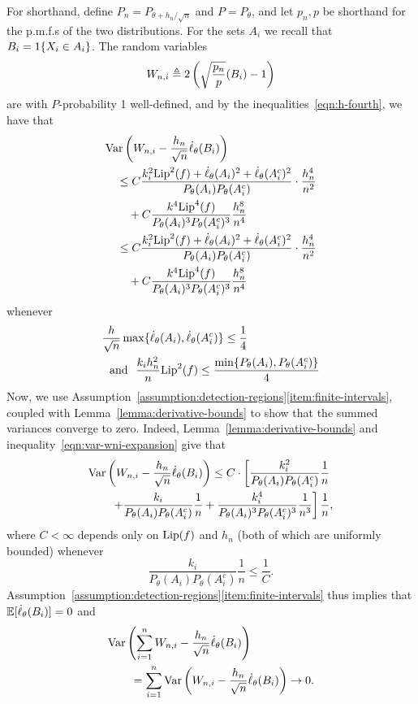 For shorthand, define $P_n = P_{\theta + h_n / \sqrt{n}}$ and $P =
P_\theta$, and let $p_n, p$ be shorthand for the p.m.f.s of the two
distributions.  For the sets $A_i$ we recall that $B_i = 1\!\left\{X_i \in
  A_i\right\}$.  The random variables
\begin{equation*}
  W_{n,i} \triangleq 2 \left(\sqrt{\frac{p_n}{p}}(B_i) - 1\right)
\end{equation*}
are with $P$-probability 1 well-defined, and by the
inequalities~\eqref{eqn:h-fourth}, we have
that
\begin{align}
\label{eqn:var-wni-expansion}
  & \textup{Var}\left(W_{n,i} - \frac{h_n}{\sqrt{n}} \dot{\ell}_\theta(B_i)\right) \\
    & \quad \le C \frac{k_i^2 {\rm \textup{Lip}}^2(f) + \dot{\ell}_\theta(A_i)^2
      + \dot{\ell}_\theta(A_i^c)^2}{P_\theta(A_i) P_\theta(A_i^c)}
    \cdot \frac{h_n^4}{n^2} \nonumber \\
    & \qquad + C \frac{k^4 {\rm \textup{Lip}}^4(f)}{
      P_\theta(A_i)^3 P_\theta(A_i^c)^3}
    \frac{h_n^8}{n^4} \nonumber \\
  & \quad \le 
  C \frac{k_i^2 {\rm \textup{Lip}}^2(f) + \dot{\ell}_\theta(A_i)^2
  + \dot{\ell}_\theta(A_i^c)^2}{P_\theta(A_i) P_\theta(A_i^c)}
  \cdot \frac{h_n^4}{n^2} \\
  & \qquad + C \frac{k^4 {\rm \textup{Lip}}^4(f)}{
    P_\theta(A_i)^3 P_\theta(A_i^c)^3}
  \frac{h_n^8}{n^4}
\end{align}
whenever
\begin{align*}
  & \frac{h}{\sqrt{n}} \max\{\dot{\ell}_\theta(A_i),
  \dot{\ell}_\theta(A_i^c)\}
  \le \frac{1}{4} \\
  & ~~ \mbox{and} ~~
  \frac{k_i h_n^2}{n} {\rm \textup{Lip}}^2(f)
  \le \frac{\min\{P_\theta(A_i), P_\theta(A_i^c)\}}{4}
\end{align*}
Now, we use
Assumption~\ref{assumption:detection-regions}\eqref{item:finite-intervals},
coupled with Lemma~\ref{lemma:derivative-bounds} to show that the summed
variances converge to zero.  Indeed, Lemma~\ref{lemma:derivative-bounds} and
inequality~\eqref{eqn:var-wni-expansion} give that
\begin{align*}
  & \textup{Var}\left(W_{n,i} - \frac{h_n}{\sqrt{n}} \dot{\ell}_\theta(B_i)\right)
   \le C \cdot
  \left[\frac{k_i^2}{P_\theta(A_i) P_\theta(A_i^c)}
    \frac{1}{n} \right. \\
    & \left. \qquad + \frac{k_i}{P_\theta(A_i) P_\theta(A_i^c)}
    \frac{1}{n}
    + \frac{k_i^4}{P_\theta(A_i)^3 P_\theta(A_i^c)^3}
    \frac{1}{n^3}\right] \frac{1}{n},
\end{align*}
where $C < \infty$ depends only on ${\rm \textup{Lip}}(f)$ and $h_n$ (both of which are
uniformly bounded) whenever
\begin{equation*}
  \frac{k_i}{P_\theta(A_i) P_\theta(A_i^c)} \frac{1}{n} \le
  \frac{1}{C}.
\end{equation*}
Assumption~\ref{assumption:detection-regions}\eqref{item:finite-intervals}
thus implies that $\mathbb{E}[\dot{\ell}_\theta(B_i)] = 0$ and
\begin{align}
  & \textup{Var}\left(\sum_{i = 1}^n W_{n,i} - \frac{h_n}{\sqrt{n}} \dot{\ell}_\theta(B_i)
  \right) \nonumber \\
  & \qquad = \sum_{i = 1}^n \textup{Var}\left(W_{n,i} - \frac{h_n}{\sqrt{n}} \dot{\ell}_\theta(B_i)
  \right)
  \to 0. \label{eqn:summed-variances-to-zero}
\end{align}

